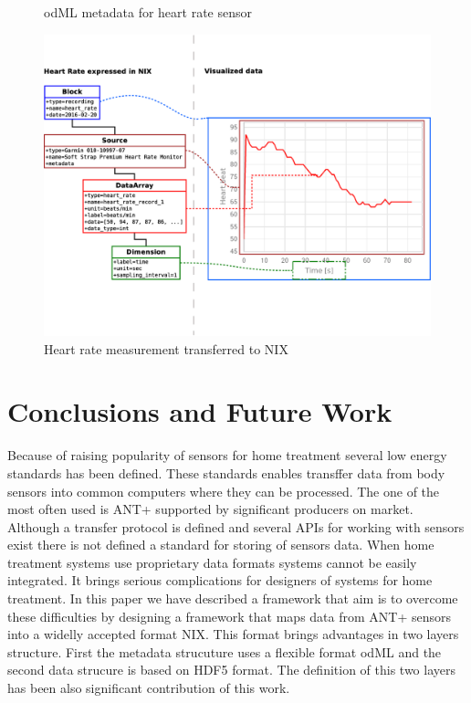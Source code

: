 \documentclass[conference]{IEEEconf}
\begin{document}
\begin{figure}

\caption{\label{odML}odML metadata for heart rate sensor}
\end{figure}

\begin{figure}
\centering\includegraphics[width=13cm]{NIX-example}
\caption{\label{NIX-ex}Heart rate measurement transferred to NIX}
\end{figure}



\section{Conclusions and Future Work}\label{sec:future-work}

Because of raising popularity of sensors for home treatment several low energy standards has been defined. These standards enables transffer data from body sensors into common computers where they can be processed. The one of the most often used is ANT+ supported by significant producers on market. Although a transfer protocol is defined and several APIs for working with sensors exist there is not defined a standard for storing of sensors data. When home treatment systems use proprietary data formats systems cannot be easily integrated. It brings serious complications for designers of systems for home treatment. In this paper we have described a framework that aim is to overcome these difficulties by designing a framework that maps data from ANT+ sensors into a widelly accepted format NIX. This format brings advantages in two layers structure. First the metadata strucuture uses a flexible format odML and the second data strucure is based on HDF5 format. The definition of this two layers has been also significant contribution of this work. 
\end{document}
